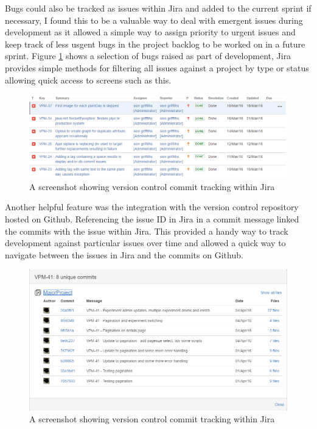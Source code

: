  Bugs could also be tracked as issues within Jira and added to the current sprint if necessary, I found this to be a valuable way to deal with emergent issues during development as it allowed a simple way to assign priority to urgent issues and keep track of less usgent bugs in the project backlog to be worked on in a future sprint. Figure \ref{fig:jira_bugs} shows a selection of bugs raised as part of development, Jira provides simple methods for filtering all issues against a project by type or status allowing quick access to screens such as this.

\begin{figure}[H]
    \centering
    \includegraphics[width=\textwidth]{images/tools/jira_bugs}
    \caption{A screenshot showing version control commit tracking within Jira}
    \label{fig:jira_bugs}
\end{figure} 

Another helpful feature was the integration with the version control repository hosted on Github. Referencing the issue ID in Jira in a commit message linked the commits with the issue within Jira. This provided a handy way to track development against particular issues over time and allowed a quick way to navigate between the issues in Jira and the commits on Github. 

\begin{figure}[H]
    \centering
    \includegraphics[width=\textwidth]{images/tools/jira_commit}
    \caption{A screenshot showing version control commit tracking within Jira}
    \label{fig:jira_commit}
\end{figure} 

